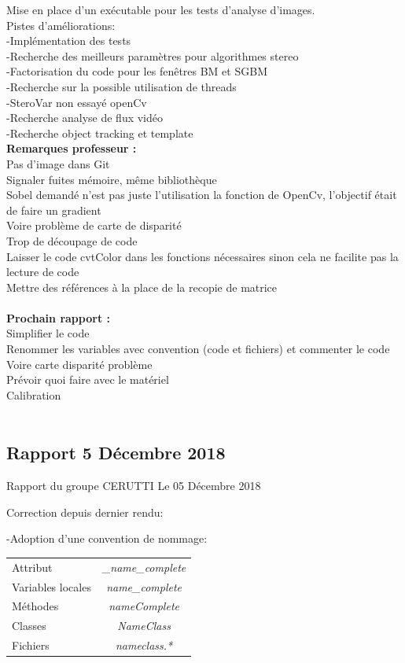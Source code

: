 \documentclass{article}
\begin{document}
Mise en place d'un exécutable pour les tests d'analyse d'images.\\

Pistes d'améliorations:\\
	-Implémentation des tests\\
	-Recherche des meilleurs paramètres pour algorithmes stereo\\
	-Factorisation du code pour les fenêtres BM et SGBM\\
	-Recherche sur la possible utilisation de threads\\
	-SteroVar non essayé openCv\\
	-Recherche analyse de flux vidéo\\
	-Recherche object tracking et template
\\

\textbf{Remarques professeur :}\\
Pas d'image dans Git\\
Signaler fuites mémoire, même bibliothèque\\
Sobel demandé n'est pas juste l'utilisation la fonction de OpenCv, l'objectif était de faire un gradient\\
Voire problème de carte de disparité\\
Trop de découpage  de code\\
Laisser le code cvtColor dans les fonctions nécessaires sinon cela ne facilite pas la lecture de code\\
Mettre des références à la place de la recopie de matrice
\\\\

\textbf{Prochain rapport :}\\
Simplifier le code\\
Renommer les variables avec convention (code et fichiers) et commenter le code\\
Voire carte disparité problème\\
Prévoir quoi faire avec le matériel\\
Calibration\\
\\

\subsection{Rapport 5 Décembre 2018}
Rapport du groupe CERUTTI
Le 05 Décembre 2018


Correction depuis dernier rendu:

    -Adoption d'une convention de nommage:\\
\begin{tabular}{ l c }
   Attribut & \textit{\_name\_complete }\\
   Variables locales  & \textit{name\_complete}\\ 
   Méthodes & \textit{nameComplete}\\
   Classes 	& \textit{NameClass}\\
   Fichiers	& \textit{nameclass.*}\\
 \end{tabular}\\
 
\end{document}
